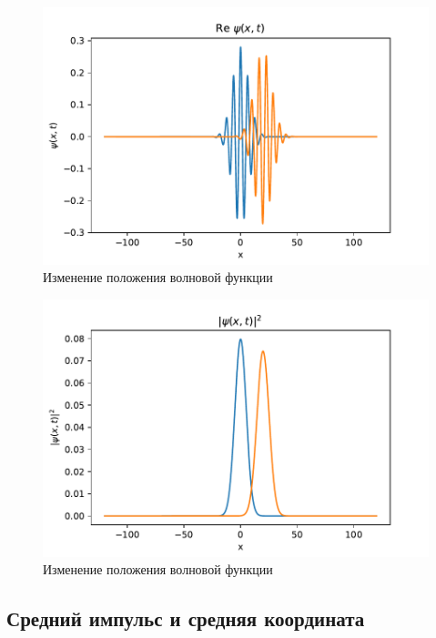 \documentclass[a4paper, 12pt]{article}
\begin{document}
    \begin{figure}[h!]
        \centering
        \includegraphics{images/PsiTimeEvolution.pdf}
        \caption{Изменение положения волновой функции}
        \label{fig:PsiTimeEvolution}
    \end{figure}

    \begin{figure}[h!]
        \centering
        \includegraphics{images/PsiTimeEvolutionPropability.pdf}
        \caption{Изменение положения волновой функции}
        \label{fig:PsiTimeEvolutionPropability}
    \end{figure}

    \subsection{Средний импульс и средняя координата}
\end{document}
